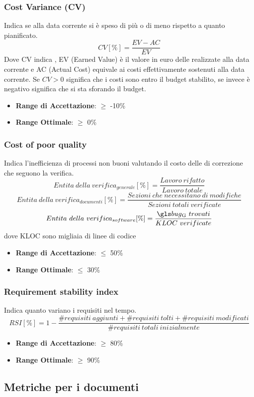 \documentclass[12pt,a4paper]{article}
\begin{document}
\subsubsection{Cost Variance (CV)}
Indica se alla data corrente si è speso di più o di meno rispetto a quanto pianificato.
\[CV [\%] = \frac{EV - AC}{EV}\]
Dove CV indica , EV (Earned Value) è il valore in euro delle  realizzate alla data corrente e AC (Actual Cost) equivale ai costi effettivamente sostenuti alla data corrente.
Se $CV > 0$ significa che i costi sono entro il budget stabilito, se invece è negativo significa che si sta sforando il budget.
\begin{itemize}
\item \textbf{Range di Accettazione}: $\geq$ -10\%
\item \textbf{Range Ottimale}: $\geq$ 0\%
\end{itemize}
\subsubsection{Cost of poor quality}
Indica l'inefficienza di processi non buoni valutando il costo delle  di correzione che seguono la verifica.
	\[Entita\ della\ verifica_{generale}[\%]= \frac{Lavoro\ rifatto}{Lavoro\ totale}\]
	\[Entita\ della\ verifica_{documenti}[\%]= \frac{Sezioni\ che\ necessitano\ di\ modifiche}{Sezioni\ totali\ verificate}\]
	\[Entita\ della\ verifica_{software}[\%]= \frac{\mgls{bug}\ trovati}{KLOC\ verificate}\]
dove KLOC sono migliaia di linee di codice
\begin{itemize}
	\item \textbf{Range di Accettazione}: $\leq$ 50\%
	\item \textbf{Range Ottimale}: $\leq$ 30\%
\end{itemize}
\subsubsection{Requirement stability index}
Indica quanto variano i requisiti nel tempo.
\[RSI[\%]= 1 - \frac{\#requisiti\ aggiunti+\#requisiti\ tolti+\#requisiti\ modificati}{\#requisiti\ totali\ inizialmente}\]
\begin{itemize}
	\item \textbf{Range di Accettazione}: $\geq$ 80\%
	\item \textbf{Range Ottimale}: $\geq$ 90\%
\end{itemize}
\subsection{Metriche per i documenti}\label{metriche_doc}
\end{document}
